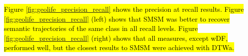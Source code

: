 \documentclass[12pt]{article}
\begin{document}
\hl{Figure {\ref{fig:geolife_precision_recall}} shows the precision at recall results. Figure {\ref{fig:geolife_precision_recall}} (left) shows that SMSM was better to recover semantic trajectories of the same class in all recall levels. Figure {\ref{fig:geolife_precision_recall}} (right) shows that all measures, except wDF, performed well, but  the closest results to SMSM were achieved with DTWa.}
\end{document}
